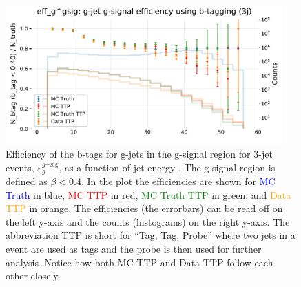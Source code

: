 \documentclass[a4paper, twoside, nobib]{tufte-book}
\newcommand{\code}[1]{\colorbox{light-gray}{\texttt{\detokenize{#1}}}}
\newcommand{\q}[1]{``#1''}
\begin{document}
\begin{figure}
  \includegraphics[width=0.95\textwidth, trim=0 0 0 40, clip]{figures/quarks/eff_g_gsig-down_sample=1.00-ML_vars=vertex-selection=b-ejet_min=4-n_iter_RS_lgb=99-n_iter_RS_xgb=9-cdot_cut=0.90-version=19.pdf}
  \caption[b-Tagging Efficiency $\varepsilon_g^{g\mathrm{-sig}}$ as a function of jet energy]
          {Efficiency of the b-tags for g-jets in the g-signal region for 3-jet events, $\varepsilon_g^{g\mathrm{-sig}}$, as a function of jet energy \code{Ejet}. The g-signal region is defined as $\beta < 0.4$. In the plot the efficiencies are shown for \textcolor{blue}{MC Truth} in blue, \textcolor{red}{MC TTP} in red, \textcolor{green}{MC Truth TTP} in green, and \textcolor{orange}{Data TTP} in orange. The efficiencies (the errorbars) can be read off on the left y-axis and the counts (histograms) on the right y-axis. The abbreviation TTP is short for \q{Tag, Tag, Probe} where two jets in a event are used as tags and the probe is then used for further analysis. Notice how both MC TTP and Data TTP follow each other closely.  
          } 
  \label{fig:q:effiency_btag_gjet_gsig}
\end{figure}
\end{document}
